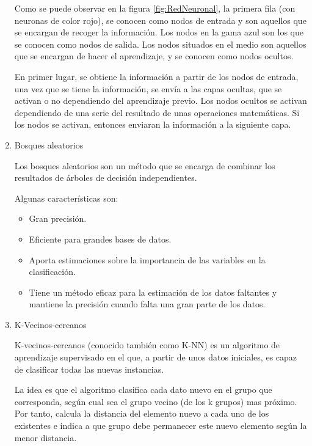 \begin{enumerate}
	Como se puede observar en la figura \ref{fig:RedNeuronal}, la primera fila (con neuronas de color rojo), se conocen como nodos de entrada y son aquellos que se encargan de recoger la información. Los nodos en la gama azul son los que se conocen como nodos de salida. Los nodos situados en el medio son aquellos que se encargan de hacer el aprendizaje, y se conocen como nodos ocultos.
	
	En primer lugar, se obtiene la información a partir de los nodos de entrada, una vez que se tiene la información, se envía a las capas ocultas, que se activan o no dependiendo del aprendizaje previo. Los nodos ocultos se activan dependiendo de una serie del resultado de unas operaciones matemáticas. Si los nodos se activan, entonces enviaran la información a la siguiente capa.
	
	\item Bosques aleatorios
	
	Los bosques aleatorios son un método que se encarga de combinar los resultados de árboles de decisión independientes.
	
	Algunas características son:
	\begin{itemize}
		\item Gran precisión.
		\item Eficiente para grandes bases de datos.
		\item Aporta estimaciones sobre la importancia de las variables en la clasificación.
		\item Tiene un método eficaz para la estimación de los datos faltantes y mantiene la precisión cuando falta una gran parte de los datos.
	\end{itemize}
	
	\item K-Vecinos-cercanos
	
	K-vecinos-cercanos (conocido también como K-NN) es un algoritmo de aprendizaje supervisado en el que, a partir de unos datos iniciales, es capaz de clasificar todas las nuevas instancias.
	
	La idea es que el algoritmo clasifica cada dato nuevo en el grupo que corresponda, según cual sea el grupo vecino (de los k grupos) mas próximo. Por tanto, calcula la distancia del elemento nuevo a cada uno de los existentes e indica a que grupo debe permanecer este nuevo elemento según la menor distancia.
	

\end{enumerate}

